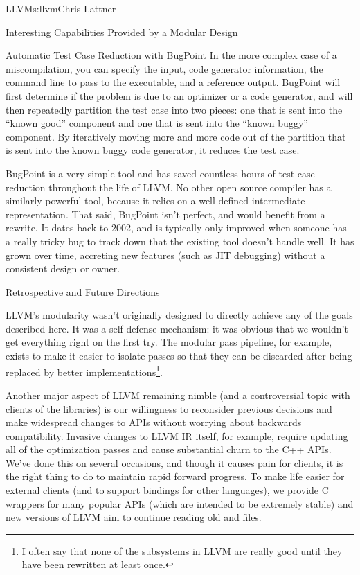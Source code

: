 \begin{aosachapter}{LLVM}{s:llvm}{Chris Lattner}
\begin{aosasect1}{Interesting Capabilities Provided by a Modular Design}
\begin{aosasect2}{Automatic Test Case Reduction with BugPoint}
In the more complex case of a miscompilation, you can specify the
input, code generator information, the command line to pass to the
executable, and a reference output. BugPoint will first determine if
the problem is due to an optimizer or a code generator, and will then
repeatedly partition the test case into two pieces: one that is sent
into the ``known good'' component and one that is sent into the
``known buggy'' component.  By iteratively moving more and more code
out of the partition that is sent into the known buggy code generator,
it reduces the test case.

BugPoint is a very simple tool and has saved countless hours of test
case reduction throughout the life of LLVM\@.  No other open source
compiler has a similarly powerful tool, because it relies on a
well-defined intermediate representation.  That said, BugPoint isn't
perfect, and would benefit from a rewrite.  It dates back to 2002, and
is typically only improved when someone has a really tricky bug to
track down that the existing tool doesn't handle well. It has grown
over time, accreting new features (such as JIT debugging) without a
consistent design or owner.

\end{aosasect2}

\end{aosasect1}

\begin{aosasect1}{Retrospective and Future Directions}

LLVM's modularity wasn't originally designed to directly achieve any
of the goals described here. It was a self-defense mechanism: it was
obvious that we wouldn't get everything right on the first try.  The
modular pass pipeline, for example, exists to make it easier to
isolate passes so that they can be discarded after being replaced by
better implementations\footnote{I often say that none of the
subsystems in LLVM are really good until they have been rewritten at
least once.}.

Another major aspect of LLVM remaining nimble (and a controversial
topic with clients of the libraries) is our willingness to reconsider
previous decisions and make widespread changes to APIs without
worrying about backwards compatibility.  Invasive changes to LLVM IR
itself, for example, require updating all of the optimization passes
and cause substantial churn to the C++ APIs.  We've done this on
several occasions, and though it causes pain for clients, it is the
right thing to do to maintain rapid forward progress.  To make life
easier for external clients (and to support bindings for other
languages), we provide C wrappers for many popular APIs (which are
intended to be extremely stable) and new versions of LLVM aim to
continue reading old  and  files.


\end{aosasect1}
\end{aosachapter}
